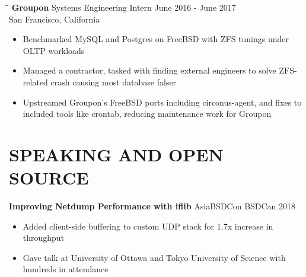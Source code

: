 \documentclass{res}
\begin{document}
\begin{resume}
\begin{tabbing}
  \hspace{2.3in}\= \hspace{2.6in}\= \kill %
         {\bf Groupon} \>Systems Engineering Intern     \>June 2016 - June 2017\\
         San Francisco, California
\end{tabbing}

\begin{itemize}
  \item Benchmarked MySQL and Postgres on FreeBSD with ZFS tunings under OLTP workloads
  \item Managed a contractor, tasked with finding external engineers to solve ZFS-related crash causing most database falser
  \item Upstreamed Groupon's FreeBSD ports including circonus-agent, and fixes to included tools like crontab, reducing maintenance work for Groupon
\end{itemize}

\section{SPEAKING AND OPEN SOURCE}          
\vspace{.05in}
 
{\bf Improving Netdump Performance with iflib} AsiaBSDCon BSDCan 2018
\begin{itemize}
  \item Added client-side buffering to custom UDP stack for 1.7x increase in throughput 
  \item Gave talk at University of Ottawa and Tokyo University of Science with hundreds in attendance
\end{itemize}


\end{resume}
\end{document}

